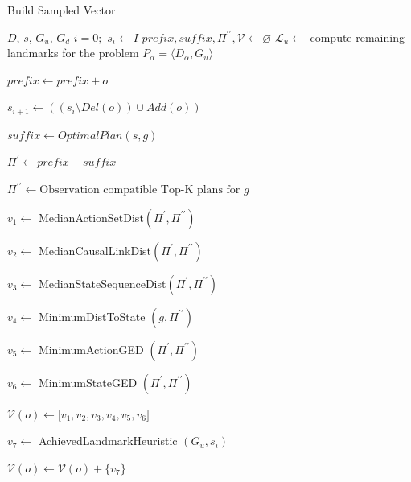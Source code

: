 \documentclass[letterpaper]{article}
\theoremstyle{plain}
\begin{document}
\setlength{\textfloatsep}{2pt}
\begin{algorithm}[tb]
        \caption{Build Sampled Vector}
        \label{alg:apx}
        \begin{algorithmic}[1]
                \Require $D$, $s$, $G_u$, $G_d$
                \State $i=0;$ $ s_{i} \gets I $
                \State $prefix,suffix,\Pi^{\prime\prime}, \mathcal{V} \gets \varnothing$
                        \State $\mathcal{L}_{u} \gets$ compute remaining landmarks for the problem $P_\alpha=\langle D_\alpha, G_u\rangle$
                        \State \parbox[t]{0.95\linewidth}{$prefix \gets prefix + o$}
                        \State \parbox[t]{0.95\linewidth} 
                                {$s_{i+1} \gets ((s_{i} \setminus Del(o))\cup Add(o))$}
                                \State \parbox[t]{0.95\linewidth}{$suffix \gets OptimalPlan(s,g)$}
                                \State \parbox[t]{0.95\linewidth}{$\Pi^\prime \gets prefix + suffix$}
                                \State \parbox[t]{0.95\linewidth}{$\Pi^{\prime\prime} \gets \text{Observation compatible Top-K plans for } g$}
                                \State \parbox[t]{0.95\linewidth}{$v_1 \gets$ MedianActionSetDist$(\Pi^\prime, \Pi^{\prime\prime})$}
                                \State \parbox[t]{0.95\linewidth}{$v_2 \gets$ MedianCausalLinkDist$(\Pi^\prime, \Pi^{\prime\prime})$}
                                \State \parbox[t]{0.95\linewidth}{$v_3 \gets$ MedianStateSequenceDist$(\Pi^\prime,\Pi^{\prime\prime})$}
                                \State \parbox[t]{0.95\linewidth}{$v_4 \gets$ MinimumDistToState $(g,\Pi^{\prime\prime})$}
                                \State \parbox[t]{0.95\linewidth}{$v_5 \gets$ MinimumActionGED $(\Pi^\prime, \Pi^{\prime\prime})$}
                                \State \parbox[t]{0.95\linewidth}{$v_6 \gets$ MinimumStateGED $(\Pi^\prime, \Pi^{\prime\prime})$}
                                \State $\mathcal{V}(o) \gets \lbrack v_1,v_2,v_3,v_4,v_5,v_6\rbrack $
                        \EndFor
                        \State \parbox[t]{0.95\linewidth}{$v_7 \gets$ AchievedLandmarkHeuristic $(G_u,s_{i})$}
                        \State $\mathcal{V}(o) \gets \mathcal{V}(o)+\{v_7\}$
                \EndFor
                \EndProcedure
        \end{algorithmic}
\end{algorithm}
\end{document}

